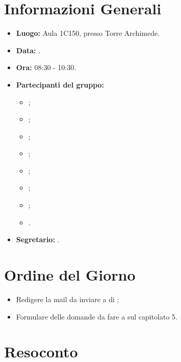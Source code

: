 \section{Informazioni Generali}
\begin{itemize}
\item \textbf{Luogo:} Aula 1C150, presso Torre Archimede.
\item \textbf{Data:} \Data.
\item \textbf{Ora:} 08:30 - 10:30.
\item \textbf{Partecipanti del gruppo:}
	\begin{itemize}
		\item \AT{}; 
		\item \BR{};
		\item \CE{}; 
		\item \DF{};
		\item \LD{};
		\item \MC{};
		\item \PF{};
		\item \SE{}.
	\end{itemize} 
\item \textbf{Segretario:} \PF{}.
\end{itemize}

\section{Ordine del Giorno}
\begin{itemize}
	\item Redigere la mail da inviare a \ZD{} di \Proponente{};
	\item Formulare delle domande da fare a \ZD{} sul capitolato 5.
\end{itemize}

\section{Resoconto}
